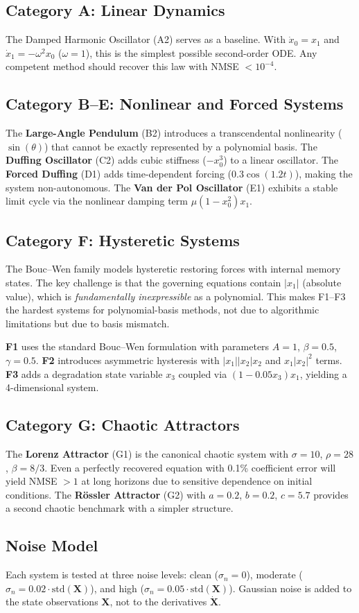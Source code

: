 \subsection{Category A: Linear Dynamics}
The Damped Harmonic Oscillator (A2) serves as a baseline. With $\dot{x}_0 = x_1$ and $\dot{x}_1 = -\omega^2 x_0$ ($\omega = 1$), this is the simplest possible second-order ODE. Any competent method should recover this law with NMSE $< 10^{-4}$.

\subsection{Category B--E: Nonlinear and Forced Systems}
The \textbf{Large-Angle Pendulum} (B2) introduces a transcendental nonlinearity ($\sin(\theta)$) that cannot be exactly represented by a polynomial basis. The \textbf{Duffing Oscillator} (C2) adds cubic stiffness ($-x_0^3$) to a linear oscillator. The \textbf{Forced Duffing} (D1) adds time-dependent forcing ($0.3\cos(1.2t)$), making the system non-autonomous. The \textbf{Van der Pol Oscillator} (E1) exhibits a stable limit cycle via the nonlinear damping term $\mu(1 - x_0^2)x_1$.

\subsection{Category F: Hysteretic Systems}
The Bouc--Wen family \cite{boucwen1976} models hysteretic restoring forces with internal memory states. The key challenge is that the governing equations contain $|x_1|$ (absolute value), which is \textit{fundamentally inexpressible} as a polynomial. This makes F1--F3 the hardest systems for polynomial-basis methods, not due to algorithmic limitations but due to basis mismatch.

\textbf{F1} uses the standard Bouc--Wen formulation with parameters $A = 1$, $\beta = 0.5$, $\gamma = 0.5$. \textbf{F2} introduces asymmetric hysteresis with $|x_1||x_2|x_2$ and $x_1|x_2|^2$ terms. \textbf{F3} adds a degradation state variable $x_3$ coupled via $(1 - 0.05 x_3)x_1$, yielding a 4-dimensional system.

\subsection{Category G: Chaotic Attractors}
The \textbf{Lorenz Attractor} (G1) \cite{lorenz1963} is the canonical chaotic system with $\sigma = 10$, $\rho = 28$, $\beta = 8/3$. Even a perfectly recovered equation with 0.1\% coefficient error will yield NMSE $> 1$ at long horizons due to sensitive dependence on initial conditions. The \textbf{R\"{o}ssler Attractor} (G2) \cite{rossler1976} with $a = 0.2$, $b = 0.2$, $c = 5.7$ provides a second chaotic benchmark with a simpler structure.

\subsection{Noise Model}
Each system is tested at three noise levels: clean ($\sigma_n = 0$), moderate ($\sigma_n = 0.02 \cdot \text{std}(\mathbf{X})$), and high ($\sigma_n = 0.05 \cdot \text{std}(\mathbf{X})$). Gaussian noise is added to the state observations $\mathbf{X}$, not to the derivatives $\dot{\mathbf{X}}$.
